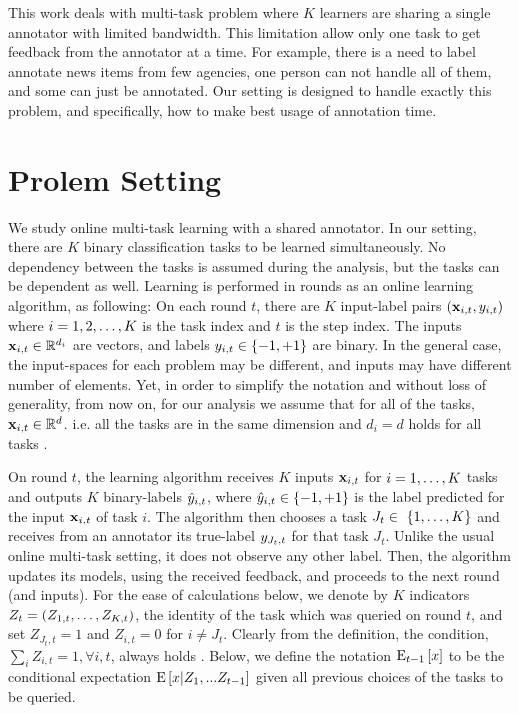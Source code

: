 This work deals with multi-task problem where $K$ learners are sharing a single annotator with limited bandwidth. This limitation allow only one task to get feedback from the annotator at a time. For example, there is a need to label annotate news items from few agencies, one person can not handle all of them, and some can just be annotated. Our setting is designed to handle exactly this problem, and specifically, how to make best usage of annotation time. 

\section{Prolem Setting}
\label{sec:setting}
We study online multi-task learning with a shared annotator. In our setting, there are
$K$  binary classification tasks to be learned simultaneously. 
No dependency between the tasks is assumed during the analysis, but the tasks can be dependent as well. 
Learning is performed in rounds as an online learning algorithm, as following: 
On each round $t$, there are $K$ input-label pairs
$(\mathbf{x}_{i,t},y_{i,t})$ where $i=1,2, \ldots , K$ is the task index and $t$ is the step index. The inputs $\mathbf{x}_{i,t}\in\mathbb{R}^{d_i}$ are
vectors, and labels  $y_{i,t}\in\{-1,+1\}$ are binary. In the general
case, the input-spaces for each problem may be different, and inputs may
have different number of elements. Yet, in order to  simplify the notation and without loss of generality,  from now
on, for our analysis we assume that for all of the tasks, $\mathbf{x}_{i,t}\in\mathbb{R}^{d}$. i.e. all the tasks are in the same dimension and   $d_i = d$ holds for all tasks . 


On round $t$, the learning algorithm receives $K$ inputs $\mathbf{x}_{i,t}$
for $i=1 , \ldots , K$ tasks and outputs $K$ binary-labels $\hat{y}_{i,t}$, where
$\hat{y}_{i,t}\in\{-1,+1\}$ is the label predicted for the input
$\mathbf{x}_{i,t}$ of task $i$. The algorithm then chooses a task $J_t \in\
\{1 , \ldots , K\}$ and receives from an annotator its true-label
$y_{J_t,t}$ for that task $J_t$. Unlike the usual online multi-task setting, it  does not observe any other
label. Then, the algorithm updates its models, using the received feedback, and proceeds to the
next round (and inputs).  For the ease of calculations below, we denote
by $K$ indicators $Z_t=\left({ Z_{1,t} , \ldots , Z_{K,t}}\right)$, the
identity of the task which was queried on round $t$, and set
$Z_{J_t,t}=1$ and $Z_{i,t}=0$ for $i\ne J_t$. Clearly from the definition, the condition, $\sum_i
Z_{i,t}=1 ,\forall{i,t}$, always holds . Below, we define the notation ${\rm E}_{t-1}\left[{x}\right]$ to be the
conditional expectation ${\rm E}\left[{x \vert Z_{1},...Z_{t-1}}\right]$ given all
previous choices of the tasks to be queried.



